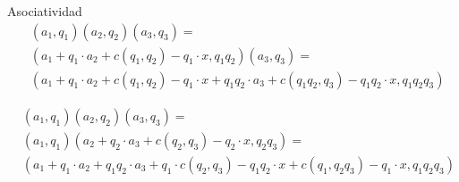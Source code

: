 Asociatividad
\begin{align*}
	&(a_1,q_1)(a_2,q_2)(a_3,q_3) =\\
	 &(a_1 + q_1\cdot a_2 + c(q_1,q_2) - q_1\cdot x,q_1q_2)(a_3,q_3) =\\
	  &(a_1 + q_1\cdot a_2 + c(q_1,q_2) - q_1\cdot x + q_1q_2\cdot a_3 + c(q_1q_2,q_3)-q_1q_2\cdot x,q_1q_2q_3)
\end{align*}

\begin{align*}
	&(a_1,q_1)(a_2,q_2)(a_3,q_3) = \\ 
	&(a_1,q_1)(a_2+q_2\cdot a_3 + c(q_2,q_3) - q_2\cdot x,q_2q_3) =\\
	&(a_1+q_1\cdot a_2 + q_1q_2\cdot a_3 + q_1\cdot c(q_2,q_3) - q_1q_2\cdot x + c(q_1,q_2q_3) - q_1\cdot x,q_1q_2q_3)
\end{align*}